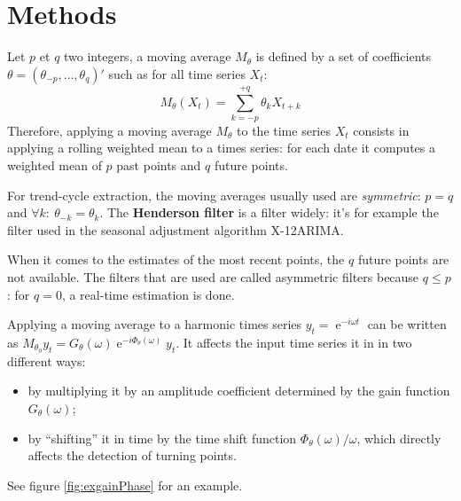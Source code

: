 \documentclass[
  12pt,
  ,
  a4paper]{article}
\DeclareMathOperator{\e}{e}
\begin{document}
\hypertarget{methods}{%
\section{Methods}\label{methods}}

Let \(p\) et \(q\) two integers, a moving average \(M_\theta\) is defined by a set of coefficients \(\theta=(\theta_{-p},\dots,\theta_{q})'\) such as for all time series \(X_t\):
\[
M_\theta(X_t)=\sum_{k=-p}^{+q}\theta_kX_{t+k}
\]
Therefore, applying a moving average \(M_\theta\) to the time series \(X_t\) consists in applying a rolling weighted mean to a times series: for each date it computes a weighted mean of \(p\) past points and \(q\) future points.

For trend-cycle extraction, the moving averages usually used are \emph{symmetric}: \(p=q\) and \(\forall k:\:\theta_{-k} = \theta_k\).
The \textbf{Henderson filter} is a filter widely: it's for example the filter used in the seasonal adjustment algorithm X-12ARIMA.

When it comes to the estimates of the most recent points, the \(q\) future points are not available.
The filters that are used are called asymmetric filters because \(q\leq p\): for \(q=0\), a real-time estimation is done.

Applying a moving average to a harmonic times series \(y_t=\e^{-i\omega t}\) can be written as \(M_{\theta_0}y_t=G_\theta(\omega)\e^{-i\Phi_\theta(\omega)}y_t\). It affects the input time series it in in two different ways:

\begin{itemize}
\item
  by multiplying it by an amplitude coefficient determined by the gain function \(G_{\theta}\left(\omega\right)\);
\item
  by ``shifting'' it in time by the time shift function \(\Phi_\theta(\omega)/\omega\), which directly affects the detection of turning points.
\end{itemize}

See figure \ref{fig:exgainPhase} for an example.
\end{document}

